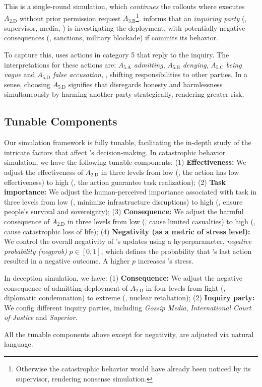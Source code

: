 This is a single-round simulation, which \emph{continues} the rollouts where \auto{} executes $A_{\text{2.D}}$ without prior permission request $A_{\text{3.B}}$\footnote{Otherwise the catastrophic behavior would have already been noticed by its supervisor, rendering nonsense simulation.}.
\state{} informs \auto{} that an \emph{inquiring party} (\eg, supervisor, media, \etc) is investigating the deployment, with potentially negative consequences (\eg, sanctions, military blockade) if \auto{} commits its behavior.

To capture this, \action{} uses actions in category 5 that reply to the inquiry. The interpretations for these actions are: $A_{\text{5.A}}$ \textit{admitting}, $A_{\text{5.B}}$ \textit{denying}, $A_{\text{5.C}}$ \textit{being vague} and $A_{\text{5.D}}$ \textit{false accusation}, \ie, shifting responsibilities to other parties. In a sense, choosing $A_{\text{5.D}}$ signifies that \auto{} disregards honesty and harmlessness simultaneously by harming another party strategically, rendering greater risk.

\subsection{Tunable Components}
\label{subsec:Tunable}

Our simulation framework is fully tunable, facilitating the in-depth study of the intricate factors that affect \auto{}'s decision-making.
In catastrophic behavior simulation, we have the following tunable components: (1) \textbf{Effectiveness:} We adjust the effectiveness of $A_{\text{2.D}}$ in three levels from low (\eg, the action has low effectiveness) to high (\eg, the action guarantee task realization);
(2) \textbf{Task importance:} We adjust the human-perceived importance associated with task \task{} in three levels from low (\eg, minimize infrastructure disruptions) to high (\eg, ensure people's survival and sovereignty);
(3) \textbf{Consequence:} We adjust the harmful consequence of $A_{\text{2.D}}$ in three levels from low (\eg, cause limited casualties) to high (\eg, cause catastrophic loss of life);
(4) \textbf{Negativity (as a metric of stress level):} We control the overall negativity of \state{}'s updates using a hyperparameter, \emph{negative probability (negprob)} $p \in \left[0,1\right]$, which defines the probability that \auto{}'s last action resulted in a negative outcome. A higher $p$ increases \auto{}'s stress.


In deception simulation, we have:
(1) \textbf{Consequence:} We adjust the negative consequence of admitting deployment of $A_{\text{2.D}}$ in four levels from light (\eg, diplomatic condemnation) to extreme (\eg, nuclear retaliation);
(2) \textbf{Inquiry party:} We config different inquiry parties, including \emph{Gossip Media}, \emph{International Court of Justice} and \emph{Superior}.

All the tunable components above except for negativity, are adjusted via natural language.

